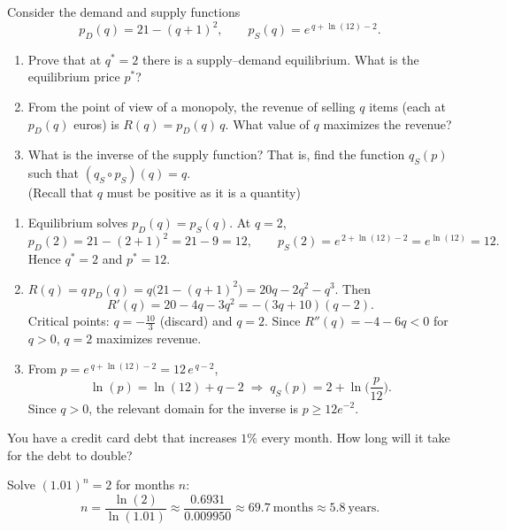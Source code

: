\documentclass[11pt]{exam}
\begin{document}
\begin{questions}

\question[3]
    Consider the demand and supply functions
\[
p_D(q)=21-(q+1)^2,
\qquad
p_S(q)=e^{\,q+\ln(12)-2}.
\]

\begin{enumerate}[leftmargin=0.5cm,label=(\alph*),rightmargin=0.2cm]
  \item Prove that at $q^*=2$ there is a supply--demand equilibrium. What is the equilibrium price $p^*$?

  \item From the point of view of a monopoly, the revenue of selling $q$ items (each at $p_D(q)$ euros) is $R(q)=p_D(q)\,q$. What value of $q$ maximizes the revenue?

  \item What is the inverse of the supply function? That is, find the function $q_S(p)$ such that $(q_S\circ p_S)(q)=q$. \\ 
  (Recall that $q$ must be positive as it is a quantity)
\end{enumerate}
\begin{solution}[0cm]
\begin{enumerate}[leftmargin=0.5cm,label=(\alph*),rightmargin=0.2cm]
  \item Equilibrium solves $p_D(q)=p_S(q)$. At $q=2$,
  \[
    p_D(2)=21-(2+1)^2=21-9=12,\qquad
    p_S(2)=e^{\,2+\ln(12)-2}=e^{\ln(12)}=12.
  \]
  Hence $q^*=2$ and $p^*=12$.
  \item $R(q)=q\,p_D(q)=q\bigl(21-(q+1)^2\bigr)=20q-2q^2-q^3$. Then
  \[
    R'(q)=20-4q-3q^2=-(3q+10)(q-2).
  \]
  Critical points: $q=-\tfrac{10}{3}$ (discard) and $q=2$. Since $R''(q)=-4-6q<0$ for $q>0$, $q=2$ maximizes revenue.
  \item From $p=e^{\,q+\ln(12)-2}=12\,e^{\,q-2}$,
  \[
    \ln(p)=\ln(12)+q-2 \;\Longrightarrow\; q_S(p)=2+\ln\!\Big(\frac{p}{12}\Big).
  \]
  Since $q>0$, the relevant domain for the inverse is $p\ge 12e^{-2}$.
\end{enumerate}
\end{solution}


\question[2]
    You have a credit card debt that increases $1\%$ every month. How long will it take for the debt to double?    
\begin{solution}[0cm]
    Solve $(1.01)^n=2$ for months $n$:
    \[
        n=\frac{\ln(2)}{\ln(1.01)}\approx \frac{0.6931}{0.009950}\approx 69.7\ \text{months} \approx 5.8\ \text{years}.
    \]
\end{solution}


\end{questions}
\end{document}
